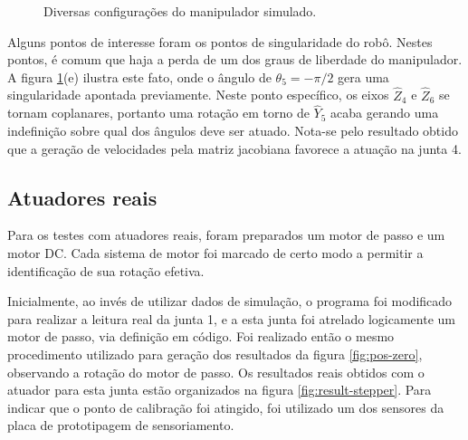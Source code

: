 \begin{figure}[h!]
\begin{centering}
\begin{floatrow}
    \end{floatrow}


\caption{Diversas configurações do manipulador simulado.}
\label{fig:pos-varias}

\par\end{centering}
\end{figure}

Alguns pontos de interesse foram os pontos de singularidade do robô. Nestes pontos, é comum
que haja a perda de um dos graus de liberdade do manipulador. A figura \ref{fig:pos-varias}(e) 
ilustra este fato, onde o ângulo de $\theta_5 = -\pi/2$ gera uma singularidade apontada previamente.
Neste ponto específico, os eixos $\hat{Z}_4$ e $\hat{Z}_6$ se tornam coplanares, portanto uma 
rotação em torno de $\hat{Y}_5$ acaba gerando uma indefinição sobre qual dos ângulos deve ser
atuado. Nota-se pelo resultado obtido que a geração de velocidades pela matriz jacobiana favorece a atuação
na junta 4.

\subsection{Atuadores reais}

Para os testes com atuadores reais, foram preparados um motor de passo e um motor DC. Cada
sistema de motor foi marcado de certo modo a permitir a identificação de sua rotação efetiva. 

Inicialmente, ao invés de utilizar dados de simulação, o programa foi modificado para realizar 
a leitura real da junta 1, e a esta junta foi atrelado logicamente um motor de passo, via definição em código. 
Foi realizado então o mesmo procedimento utilizado para geração dos resultados da figura 
\ref{fig:pos-zero}, observando a rotação do motor de passo. Os resultados reais obtidos 
com o atuador para esta junta estão organizados na figura \ref{fig:result-stepper}.
Para indicar que o ponto de calibração foi atingido, foi utilizado um dos sensores da placa 
de prototipagem de sensoriamento.

